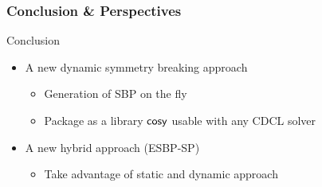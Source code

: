 \documentclass{beamer}
\begin{document}
\begin{frame}
\frametitle{Conclusion \& Perspectives}

	 Conclusion
	\begin{itemize}
	\item A new dynamic symmetry breaking approach
	\begin{itemize}
		\item Generation of SBP on the fly
		\item Package as a library $\textsf{cosy}$ usable with any CDCL solver
	\end{itemize}

	\item A new hybrid approach (ESBP-SP)
	\begin{itemize}
		\item Take advantage of static and dynamic approach
		\visible<2->{\item \textcolor{orange}{Combination of  CDCL[Sym] with SEL}}
	\end{itemize}
\end{itemize}
\vfill
{}
\vfill
\flushright
{}
\end{frame}
%
%
%
%
%
%
%
\end{document}
